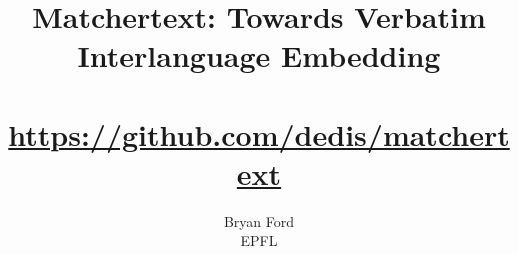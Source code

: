 \documentclass[fullpage,twocolumn]{article}
\begin{document}
\title{Matchertext: Towards Verbatim Interlanguage Embedding \\
	\Large{%
	~\\
	\url{https://github.com/dedis/matchertext}}}

\author{Bryan Ford \\ EPFL}

\maketitle



\tableofcontents












\arxiv{

}{

}
\end{document}
